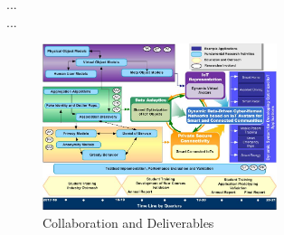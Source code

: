 ...\\
...\\ 

\begin{figure} \vspace{-3mm}
	\centerline{\includegraphics[width=0.61\textwidth]{./Timeline-v1.jpg}}
	\vspace{-3mm} \caption{Collaboration and Deliverables}
	\label{fig8}
	\vspace{-3mm}
\end{figure}
